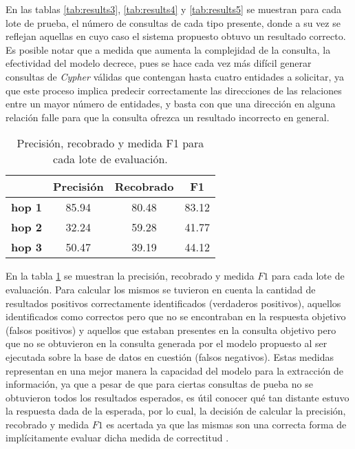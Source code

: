 En las tablas \ref{tab:results3}, \ref{tab:results4} y \ref{tab:results5} se muestran para cada lote de prueba, el número de consultas de cada tipo presente, donde a su vez se reflejan aquellas en cuyo caso el sistema propuesto obtuvo un resultado correcto. Es posible notar que a medida que aumenta la complejidad de la consulta, la efectividad del modelo decrece, pues se hace cada vez más difícil generar consultas de \textit{Cypher} válidas que contengan hasta cuatro entidades a solicitar, ya que este proceso implica predecir correctamente las direcciones de las relaciones entre un mayor número de entidades, y basta con que una dirección en alguna relación falle para que la consulta ofrezca un resultado incorrecto en general.

\begin{table}[H]
\centering
\begin{tabular}{|c|c|c|c|}
\hline
 & \textbf{Precisión} & \textbf{Recobrado} & \textbf{F1} \\ \hline
\textbf{hop 1} & 85.94 & 80.48  & 83.12 \\ \hline
\textbf{hop 2} & 32.24 & 59.28 & 41.77 \\ \hline
\textbf{hop 3} & 50.47 & 39.19 & 44.12 \\ \hline
\end{tabular}
\caption{Precisión, recobrado y medida F1 para cada lote de evaluación.}
\label{tab:results6}
\end{table}

En la tabla \ref{tab:results6} se muestran la precisión, recobrado y medida $F1$ para cada lote de evaluación. Para calcular los mismos se tuvieron en cuenta la cantidad de resultados positivos correctamente identificados (verdaderos positivos), aquellos identificados como correctos pero que no se encontraban en la respuesta objetivo (falsos positivos) y aquellos que estaban presentes en la consulta objetivo pero que no se obtuvieron en la consulta generada por el modelo propuesto al ser ejecutada sobre la base de datos en cuestión (falsos negativos). Estas medidas representan en una mejor manera la capacidad del modelo para la extracción de información, ya que a pesar de que para ciertas consultas de pueba no se obtuvieron todos los resultados esperados, es útil conocer qué tan distante estuvo la respuesta dada de la esperada, por lo cual, la decisión de calcular la precisión, recobrado y medida $F1$ es acertada ya que las mismas son una correcta forma de implícitamente evaluar dicha medida de correctitud \cite{precisionrecallf1}.

